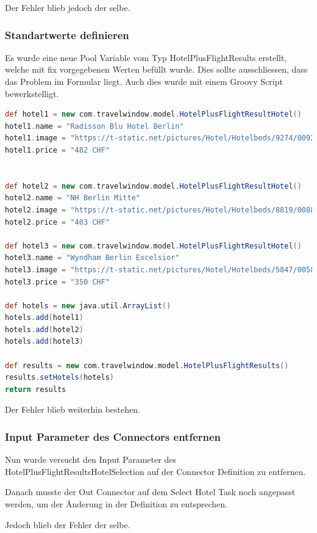Der Fehler blieb jedoch der selbe.

\subsubsection{Standartwerte definieren}
Es wurde eine neue Pool Variable vom Typ  HotelPlusFlightResults erstellt, welche mit fix vorgegebenen Werten befüllt wurde. Dies sollte ausschliessen, dass das Problem im Formular liegt. Auch dies wurde mit einem Groovy Script bewerkstelligt.

\begin{lstlisting}[language=Groovy,firstnumber=1]
def hotel1 = new com.travelwindow.model.HotelPlusFlightResultHotel()
hotel1.name = "Radisson Blu Hotel Berlin"
hotel1.image = "https://t-static.net/pictures/Hotel/Hotelbeds/9274/009274a_hb_ba_003.jpg?width=240&height=180&scale=both&mode=crop"
hotel1.price = "482 CHF"


def hotel2 = new com.travelwindow.model.HotelPlusFlightResultHotel()
hotel2.name = "NH Berlin Mitte"
hotel2.image = "https://t-static.net/pictures/Hotel/Hotelbeds/8819/008819a_hb_ba_008.jpg?width=240&height=180&scale=both&mode=crop"
hotel2.price = "403 CHF"

def hotel3 = new com.travelwindow.model.HotelPlusFlightResultHotel()
hotel3.name = "Wyndham Berlin Excelsior"
hotel3.image = "https://t-static.net/pictures/Hotel/Hotelbeds/5847/005847a_hb_l_010.jpg?width=240&height=180&scale=both&mode=crop"
hotel3.price = "350 CHF"

def hotels = new java.util.ArrayList()
hotels.add(hotel1)
hotels.add(hotel2)
hotels.add(hotel3)

def results = new com.travelwindow.model.HotelPlusFlightResults()
results.setHotels(hotels)
return results
\end{lstlisting}

Der Fehler blieb weiterhin bestehen.

\subsubsection{Input Parameter des Connectors entfernen}
Nun wurde versucht den Input Parameter des HotelPlusFlightResultsHotelSelection auf der Connector Definition zu entfernen.

Danach musste der Out Connector auf dem Select Hotel Task noch angepasst werden, um der Änderung in der Definition zu entsprechen.

Jedoch blieb der Fehler der selbe.

